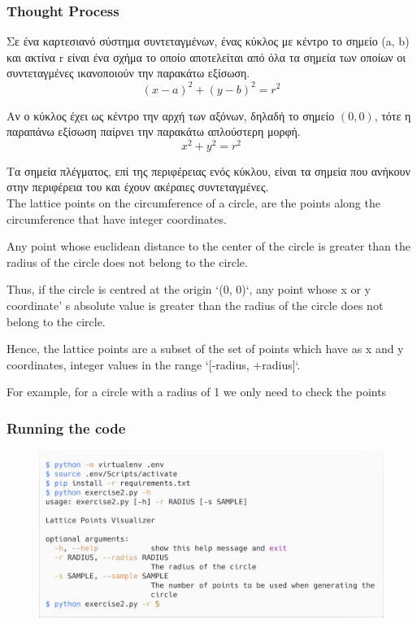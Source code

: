 \documentclass[12pt]{article}
\newenvironment{matlab}
	{\begin{figure}[hp]\centering\captionsetup{justification=centering}}
	{\end{figure}}
\begin{document}
\vspace{2in}

\subsubsection*{Thought Process}

Σε ένα καρτεσιανό σύστημα συντεταγμένων, ένας κύκλος με κέντρο το σημείο (a, b)
και ακτίνα r είναι ένα σχήμα το οποίο αποτελείται από όλα τα σημεία των οποίων
οι συντεταγμένες ικανοποιούν την παρακάτω εξίσωση. \\

\[ (x - a) ^ 2 + (y - b) ^ 2 = r ^ 2 \]

Αν ο κύκλος έχει ως κέντρο την αρχή των αξόνων, δηλαδή το σημείο \( (0, 0) \), τότε
η παραπάνω εξίσωση παίρνει την παρακάτω απλούστερη μορφή. \\

\[ x ^ 2 + y ^ 2 = r ^ 2 \]

Τα σημεία πλέγματος, επί της περιφέρειας ενός κύκλου, είναι τα σημεία που ανήκουν
στην περιφέρεια του και έχουν ακέραιες συντεταγμένες. \\

The lattice points on the circumference of a circle, are the points along the circumference that have integer coordinates.

Any point whose euclidean distance to the center of the circle is greater than the radius of the circle does not belong to the circle.

Thus, if the circle is centred at the origin `(0, 0)`, any point whose x or y coordinate' s absolute value is greater than the radius of the circle does not belong to the circle.

Hence, the lattice points are a subset of the set of points which have as x and y coordinates, integer values in the range `[-radius, +radius]`.

For example, for a circle with a radius of 1 we only need to check the points

\subsubsection*{Running the code}

\begin{matlab}
    \includegraphics[scale=0.140]{images/exercise2.png}
\end{matlab}
\end{document}
